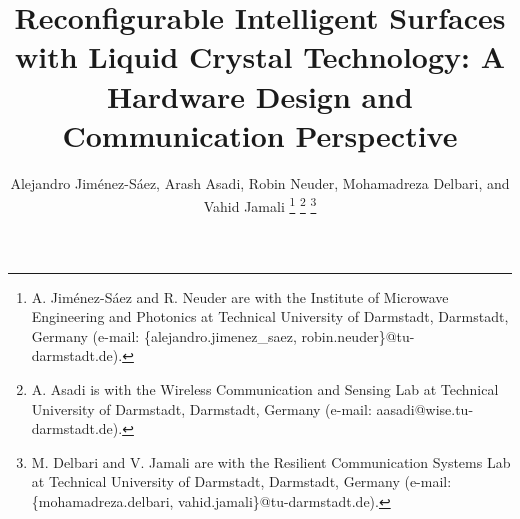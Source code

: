 \documentclass[journal]{IEEEtran}
\begin{document}
\title{Reconfigurable Intelligent Surfaces with Liquid Crystal Technology: A Hardware Design and Communication Perspective}

\author{Alejandro Jim\'enez-S\'aez,  Arash Asadi,  Robin Neuder, Mohamadreza Delbari, and Vahid Jamali
%
\thanks{A. Jim\'enez-S\'aez and R. Neuder  are with the Institute of Microwave Engineering and Photonics at Technical University of Darmstadt, Darmstadt, Germany (e-mail:  \{alejandro.jimenez\_saez, robin.neuder\}@tu-darmstadt.de).} 
%
\thanks{A. Asadi is with the Wireless Communication and Sensing Lab at Technical University of Darmstadt, Darmstadt, Germany (e-mail:  aasadi@wise.tu-darmstadt.de).} 
%
\thanks{M. Delbari and V. Jamali are with the Resilient Communication Systems Lab at Technical University of Darmstadt, Darmstadt, Germany (e-mail:  \{mohamadreza.delbari, vahid.jamali\}@tu-darmstadt.de).} 
%
}




\maketitle
\end{document}
